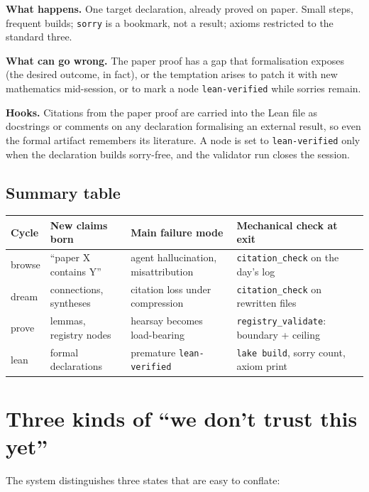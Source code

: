 \documentclass[11pt,a4paper]{article}
\newcommand{\level}[1]{\texttt{#1}}
\begin{document}
\textbf{What happens.} One target declaration, already proved on paper.
Small steps, frequent builds; \texttt{sorry} is a bookmark, not a result;
axioms restricted to the standard three.

\textbf{What can go wrong.} The paper proof has a gap that formalisation
exposes (the desired outcome, in fact), or the temptation arises to patch it
with new mathematics mid-session, or to mark a node \level{lean-verified}
while sorries remain.

\textbf{Hooks.} Citations from the paper proof are carried into the Lean
file as docstrings or comments on any declaration formalising an external
result, so even the formal artifact remembers its literature. A node is set
to \level{lean-verified} only when the declaration builds sorry-free, and
the validator run closes the session.

\subsection{Summary table}

\begin{center}
\small
\begin{tabular}{@{}lp{3.4cm}p{3.9cm}p{3.9cm}@{}}
\toprule
Cycle & New claims born & Main failure mode & Mechanical check at exit \\
\midrule
browse & ``paper X contains Y'' & agent hallucination,
  misattribution & \texttt{citation\_check} on the day's log \\
dream & connections, syntheses & citation loss under
  compression & \texttt{citation\_check} on rewritten files \\
prove & lemmas, registry nodes & hearsay becomes
  load-bearing & \texttt{registry\_validate}: boundary + ceiling \\
lean & formal declarations & premature
  \level{lean-verified} & \texttt{lake build}, sorry count, axiom print \\
\bottomrule
\end{tabular}
\end{center}

\section{Three kinds of ``we don't trust this yet''}

The system distinguishes three states that are easy to conflate:
\end{document}
